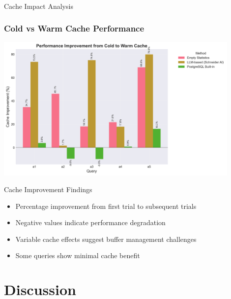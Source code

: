 \documentclass[smaller]{beamer}
\begin{document}
\begin{frame}{Cache Impact Analysis}
\frametitle{Cold vs Warm Cache Performance}

\begin{center}
\includegraphics[width=0.9\textwidth]{images/cache_improvement_comparison.png}
\end{center}

\begin{exampleblock}{Cache Improvement Findings}
\begin{itemize}
    \item Percentage improvement from first trial to subsequent trials
    \item Negative values indicate performance degradation
    \item Variable cache effects suggest buffer management challenges
    \item Some queries show minimal cache benefit
\end{itemize}
\end{exampleblock}

\end{frame}

\section{Discussion}
\end{document}
